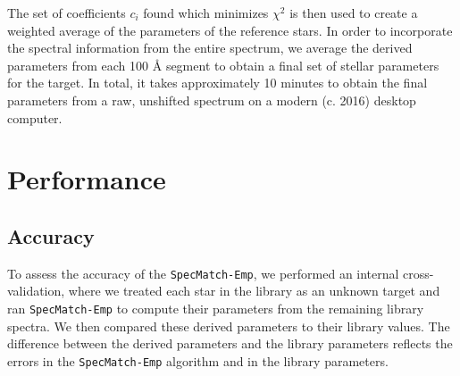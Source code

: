 \documentclass[preprint2]{aastex6}
\newcommand{\SpecMatch}{\texttt{SpecMatch-Emp}\xspace}
\newcommand{\chisq}{\ensuremath{\chi^2}\xspace}
\newcommand{\angstrom}{\AA\xspace}
\begin{document}
The set of coefficients $c_i$ found which minimizes \chisq is then used to create a weighted average of the parameters of the reference stars. In order to incorporate the spectral information from the entire spectrum, we average the derived parameters from each 100 \angstrom segment to obtain a final set of stellar parameters for the target. In total, it takes approximately 10 minutes to obtain the final parameters from a raw, unshifted spectrum on a modern (c. 2016) desktop computer.

\begin{figure*}
	\caption{Results from the linear combination approach (\autoref{ssec:lincomb}) for the star HD190406. Top: The position of the five reference stars used, with their respective coefficients. The star indicates the library parameters of the target, while the purple square denotes the weighted average of the reference parameters. Bottom: The reference spectra and linear combination found. The final \chisq of 0.160 for the linear combination is lower than the \chisq for the best matching single spectrum, \chisq = 0.43.\label{fig:Gstar_lincomb}}
\end{figure*}

\begin{figure*}
	\caption{Same as Figure~\ref{fig:Gstar_lincomb}, but for the star GL699. The final residuals between the target star and linear combination vanish almost completely (see \autoref{ssec:lincomb}). \label{fig:Mstar_lincomb}}
\end{figure*}

\section{Performance}
\label{sec:performance}

\subsection{Accuracy}
\label{ssec:accuracy}
To assess the accuracy of the \SpecMatch, we performed an internal cross-validation, where we treated each star in the library as an unknown target and ran \SpecMatch to compute their parameters from the remaining library spectra. We then compared these derived parameters to their library values. The difference between the derived parameters and the library parameters reflects the errors in the \SpecMatch algorithm and in the library parameters.
\end{document}
